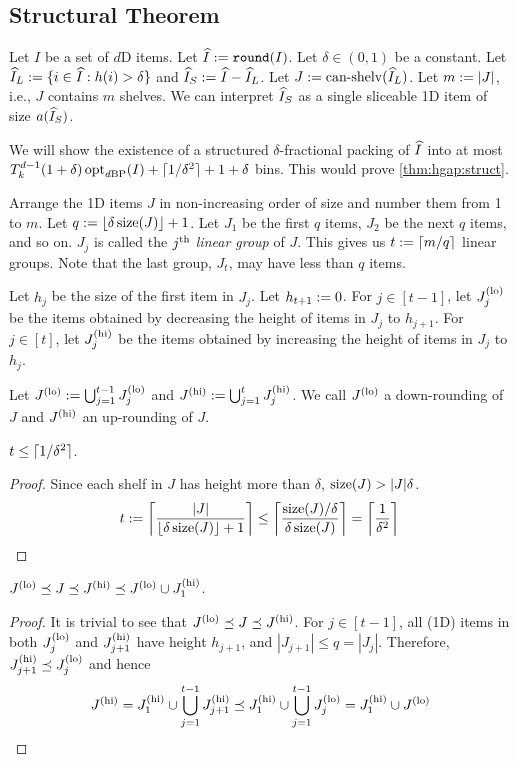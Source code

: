 \subsection{Structural Theorem}
\label{sec:hgap:struct}

Let $I$ be a set of $d$D items.
Let $\widehat{I} := \operatorname{\mathtt{round}}(I)$.
Let $\delta \in (0, 1)$ be a constant.
Let $\widehat{I}_L := \{i \in \widehat{I}: h(i) > \delta\}$ and $\widehat{I}_S := \widehat{I} - \widehat{I}_L$.
Let $J := \operatorname{can-shelv}(\widehat{I}_L)$. Let $m := |J|$, i.e., $J$ contains $m$ shelves.
We can interpret $\widehat{I}_S$ as a single sliceable 1D item of size $a(\widehat{I}_S)$.

We will show the existence of a structured $\delta$-fractional packing of $\widehat{I}$
into at most $T_k^{d-1}(1+\delta)\operatorname{opt}_{d\mathrm{BP}}(I) + \lceil 1/\delta^2 \rceil + 1 + \delta$ bins.
This would prove \cref{thm:hgap:struct}.

\begin{definition}
\label{defn:hgap:lingroup}
Arrange the 1D items $J$ in non-increasing order of size and number them from 1 to $m$.
Let $q := \left\lfloor \delta\operatorname{size}(J) \right\rfloor + 1$.
Let $J_1$ be the first $q$ items, $J_2$ be the next $q$ items, and so on.
$J_j$ is called the $j^{\textrm{th}}$ \emph{linear group} of $J$.
This gives us $t := \left\lceil m/q \right\rceil$ linear groups.
Note that the last group, $J_t$, may have less than $q$ items.

Let $h_j$ be the size of the first item in $J_j$. Let $h_{t+1} := 0$.
For $j \in [t-1]$, let $J_j^{\mathrm{(lo)}}$ be the items obtained by
decreasing the height of items in $J_j$ to $h_{j+1}$.
For $j \in [t]$, let $J_j^{\mathrm{(hi)}}$ be the items obtained by
increasing the height of items in $J_j$ to $h_j$.

Let ${J^{\mathrm{(lo)}} := \bigcup_{j=1}^{t-1} J_j^{\mathrm{(lo)}}}$
and ${J^{\mathrm{(hi)}} := \bigcup_{j=1}^t J_j^{\mathrm{(hi)}}}$.
We call $J^{\mathrm{(lo)}}$ a down-rounding of $J$ and $J^{\mathrm{(hi)}}$ an up-rounding of $J$.
\end{definition}

\begin{lemma}
\label{thm:hgap:n-pivots}
$t \le \lceil 1/\delta^2 \rceil$.
\end{lemma}
\begin{proof}
Since each shelf in $J$ has height more than $\delta$, $\operatorname{size}(J) > |J|\delta$.
\[ t := \left\lceil \frac{|J|}{\left\lfloor \delta\operatorname{size}(J) \right\rfloor+1} \right\rceil
\le \left\lceil \frac{\operatorname{size}(J)/\delta}{\delta\operatorname{size}(J)} \right\rceil
= \left\lceil \frac{1}{\delta^2} \right\rceil \qedhere \]
\end{proof}

\begin{lemma}
\label{thm:hgap:pred-chain}
$J^{\mathrm{(lo)}} \preceq J \preceq J^{\mathrm{(hi)}} \preceq J^{\mathrm{(lo)}} \cup J_1^{\mathrm{(hi)}}$.
\end{lemma}
\begin{proof}
It is trivial to see that $J^{\mathrm{(lo)}} \preceq J \preceq J^{\mathrm{(hi)}}$.
For $j \in [t-1]$, all (1D) items in both $J_j^{\mathrm{(lo)}}$ and $J_{j+1}^{\mathrm{(hi)}}$ have height $h_{j+1}$,
and $|J_{j+1}| \le q = |J_j|$. Therefore, $J_{j+1}^{\mathrm{(hi)}} \preceq J_j^{\mathrm{(lo)}}$ and hence
\[ J^{\mathrm{(hi)}} = J_1^{\mathrm{(hi)}} \cup \bigcup_{j=1}^{t-1} J_{j+1}^{\mathrm{(hi)}}
\preceq J_1^{\mathrm{(hi)}} \cup \bigcup_{j=1}^{t-1} J_j^{\mathrm{(lo)}} = J_1^{\mathrm{(hi)}} \cup J^{\mathrm{(lo)}} \qedhere \]
\end{proof}

